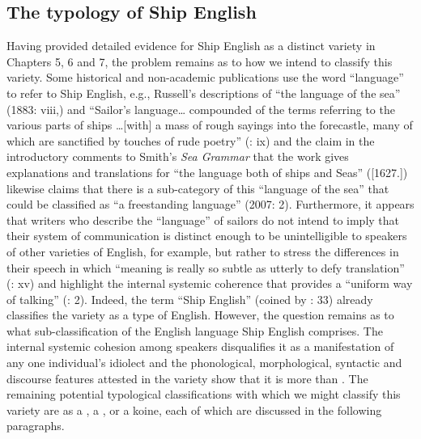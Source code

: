 \subsection{{The typology of Ship English} }%

Having provided detailed evidence for Ship English as a distinct variety in Chapters 5, 6 and 7, the problem remains as to how we intend to classify this variety. Some historical and non-academic publications use the word “language” to refer to Ship English, e.g., Russell’s descriptions of “the language of the sea” (1883: viii,) and “Sailor’s language… compounded of the terms referring to the various parts of ships …[with] a mass of rough sayings into the forecastle, many of which are sanctified by touches of rude poetry” (\citealt{Russell1883}: ix) and the claim in the introductory comments to Smith’s \textit{Sea Grammar} that the work gives explanations and translations for “the language both of ships and Seas” (\citealt{Smith1968}[1627.]) \citeauthor{Choundas2007} likewise claims that there is a sub-category of this “language of the sea” that could be classified as “a freestanding  language” (2007: 2). Furthermore, it appears that writers who describe the “language” of sailors do not intend to imply that their system of communication is distinct enough to be unintelligible to speakers of other varieties of English, for example, but rather to stress the differences in their speech in which “meaning is really so subtle as utterly to defy translation” (\citealt{Russell1883}: xv) and highlight the internal systemic coherence that provides a “uniform way of talking” (\citealt{Choundas2007}: 2). Indeed, the term “Ship English” (coined by \citealt{Hancock1976}: 33) already classifies the variety as a type of English. However, the question remains as to what sub-classification of the English language Ship English comprises. The internal systemic cohesion among speakers disqualifies it as a manifestation of any one individual’s idiolect and the phonological, morphological, syntactic and discourse features attested in the variety show that it is more than . The remaining potential typological classifications with which we might classify this variety are as a , a , or a koine, each of which are discussed in the following paragraphs. 


